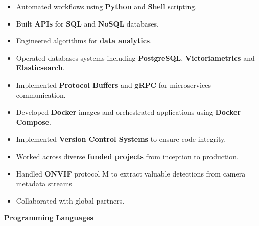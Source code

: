 \documentclass[10pt,a4paper,ragged2e,withhyper]{altacv}
\begin{document}
\begin{paracol}{2}
\begin{itemize}
            \item Automated workflows using \textcolor{heading}{\textbf{Python}} and
                  \textcolor{heading}{\textbf{Shell}} scripting.
            \item Built \textcolor{heading}{\textbf{APIs}} for \textcolor{heading}{\textbf{SQL}}
                  and \textcolor{heading}{\textbf{NoSQL}} databases.
            \item Engineered algorithms for \textcolor{heading}{\textbf{data analytics}}.
            \item Operated databases systems including \textcolor{heading}{\textbf{PostgreSQL}},
                  \textcolor{heading}{\textbf{Victoriametrics}} and
                  \textcolor{heading}{\textbf{Elasticsearch}}.
            \item Implemented \textcolor{heading}{\textbf{Protocol Buffers}} and
                  \textcolor{heading}{\textbf{gRPC}} for microservices communication.
            \item Developed \textcolor{heading}{\textbf{Docker}} images and orchestrated
                  applications using \textcolor{heading}{\textbf{Docker Compose}}.
            \item Implemented \textcolor{heading}{\textbf{Version Control Systems}} to ensure
                  code integrity.
            \item Worked across diverse \textcolor{heading}{\textbf{funded projects}} from
                  inception to production.
            
            \item Handled \textcolor{heading}{\textbf{ONVIF}} protocol M to extract valuable detections from camera metadata streams 
            
            \item Collaborated with global partners.

      \end{itemize}


      \switchcolumn


      \textbf{Programming Languages} 
      \smallbreak
      \bigbreak
   

\end{paracol}
\end{document}
